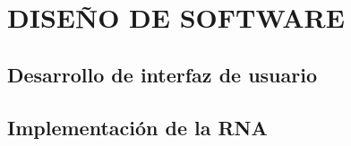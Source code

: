 \chapter{\MakeUppercase{Diseño de Software}} \label{so_design}
\thispagestyle{mainmatterstyle} %
\section{Desarrollo de interfaz de usuario}
\section{Implementación de la RNA}
